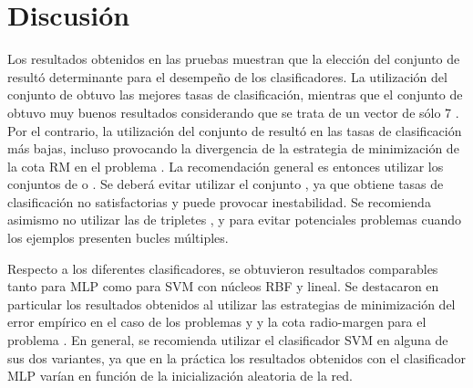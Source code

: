 %
%
%
\section{Discusión}
%
Los resultados obtenidos en las pruebas muestran que la elección del
conjunto de  resultó determinante para el desempeño de los
clasificadores.
La utilización del conjunto de   obtuvo las
mejores tasas de clasificación, mientras que el conjunto de 
 obtuvo muy buenos resultados considerando que se trata de un
vector de sólo 7 .
Por el contrario, la utilización del conjunto de  
resultó en las tasas de clasificación más bajas, incluso provocando la
divergencia de la estrategia de minimización de la cota RM en el
problema \prob\mipred{}.
La recomendación general es entonces utilizar los conjuntos de 
 o .
Se deberá evitar utilizar el conjunto , ya que obtiene tasas
de clasificación no satisfactorias y puede provocar inestabilidad.
Se recomienda asimismo no utilizar las  de tripletes
,  y  para evitar potenciales problemas
cuando los ejemplos presenten bucles múltiples.

Respecto a los diferentes clasificadores, se obtuvieron resultados
comparables tanto para MLP como para SVM con núcleos RBF y lineal.
Se destacaron en particular los resultados obtenidos al utilizar las
estrategias de minimización del error empírico en el caso de los
problemas \prob\mipred{} y \prob\micropred{} y la cota radio-margen
para el problema \prob\micropred{}.
En general, se recomienda utilizar el clasificador SVM en alguna de
sus dos variantes, ya que en la práctica los resultados obtenidos con
el clasificador MLP varían en función de la inicialización aleatoria
de la red.
